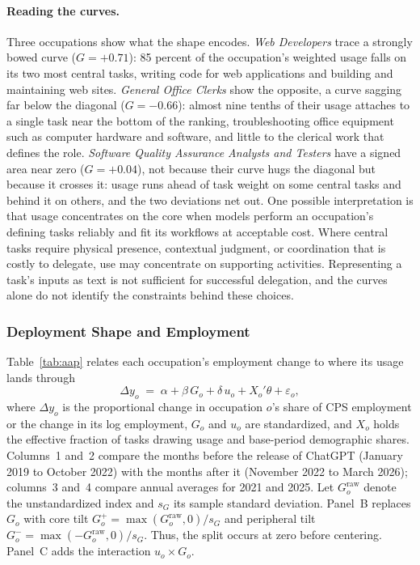 \documentclass[12pt]{article}
\theoremstyle{plain}
\theoremstyle{definition}
\theoremstyle{remark}
\begin{document}
\paragraph{Reading the curves.}
Three occupations show what the shape encodes. \emph{Web Developers} trace
a strongly bowed curve ($G=+0.71$): 85 percent of the occupation's
weighted usage falls on its two most central tasks, writing code for web
applications and building and maintaining web sites. \emph{General Office
Clerks} show the opposite, a curve sagging far below the diagonal
($G=-0.66$): almost nine tenths of their usage attaches to a single task
near the bottom of the ranking, troubleshooting office equipment such as
computer hardware and software, and little to the clerical work that
defines the role. \emph{Software Quality Assurance Analysts and Testers}
have a signed area near zero ($G=+0.04$), not because their curve hugs
the diagonal but because it crosses it: usage runs ahead of task weight
on some central tasks and behind it on others, and the two deviations
net out. One possible interpretation is that usage concentrates on the core
when models perform an occupation's defining tasks reliably and fit
its workflows at acceptable cost. Where central tasks require physical
presence, contextual judgment, or coordination that is costly to
delegate, use may concentrate on supporting activities. Representing a
task's inputs as text is not sufficient for successful delegation, and
the curves alone do not identify the constraints behind these choices.

\subsubsection{Deployment Shape and Employment}

Table~\ref{tab:aap} relates each occupation's employment change to where
its usage lands through
\begin{equation}\label{eq:aap}
  \Delta y_o \;=\; \alpha + \beta\,G_o + \delta\,u_o + X_o'\theta
  + \varepsilon_o,
\end{equation}
where $\Delta y_o$ is the proportional change in occupation $o$'s share of
CPS employment or the change in its log employment, $G_o$ and $u_o$ are
standardized, and $X_o$ holds the effective fraction of tasks drawing
usage and base-period demographic shares. Columns~1 and~2 compare the
months before the release of ChatGPT (January 2019 to October 2022) with
the months after it (November 2022 to March 2026); columns~3 and~4
compare annual averages for 2021 and 2025. Let $G_o^{\mathrm{raw}}$
denote the unstandardized index and $s_G$ its sample standard deviation.
Panel~B replaces $G_o$ with core tilt
$G_o^{+}=\max(G_o^{\mathrm{raw}},0)/s_G$ and peripheral tilt
$G_o^{-}=\max(-G_o^{\mathrm{raw}},0)/s_G$. Thus, the split occurs at
zero before centering. Panel~C adds the interaction $u_o\times G_o$.
\end{document}
